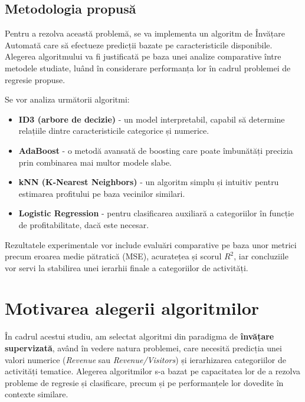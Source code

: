 \documentclass{article}
\begin{document}
\subsection*{Metodologia propusă}
Pentru a rezolva această problemă, se va implementa un algoritm de Învățare Automată care să efectueze predicții bazate pe caracteristicile disponibile. Alegerea algoritmului va fi justificată pe baza unei analize comparative între metodele studiate, luând în considerare performanța lor în cadrul problemei de regresie propuse.

Se vor analiza următorii algoritmi:
\begin{itemize}
    \item \textbf{ID3 (arbore de decizie)} - un model interpretabil, capabil să determine relațiile dintre caracteristicile categorice și numerice.
    \item \textbf{AdaBoost} - o metodă avansată de boosting care poate îmbunătăți precizia prin combinarea mai multor modele slabe.
    \item \textbf{kNN (K-Nearest Neighbors)} - un algoritm simplu și intuitiv pentru estimarea profitului pe baza vecinilor similari.
    \item \textbf{Logistic Regression} - pentru clasificarea auxiliară a categoriilor în funcție de profitabilitate, dacă este necesar.
\end{itemize}

Rezultatele experimentale vor include evaluări comparative pe baza unor metrici precum eroarea medie pătratică (MSE), acuratețea și scorul $R^2$, iar concluziile vor servi la stabilirea unei ierarhii finale a categoriilor de activități.

\section*{Motivarea alegerii algoritmilor}

În cadrul acestui studiu, am selectat algoritmi din paradigma de \textbf{învățare supervizată}, având în vedere natura problemei, care necesită predicția unei valori numerice (\textit{Revenue} sau \textit{Revenue/Visitors}) și ierarhizarea categoriilor de activități tematice. Alegerea algoritmilor s-a bazat pe capacitatea lor de a rezolva probleme de regresie și clasificare, precum și pe performanțele lor dovedite în contexte similare.
\end{document}
